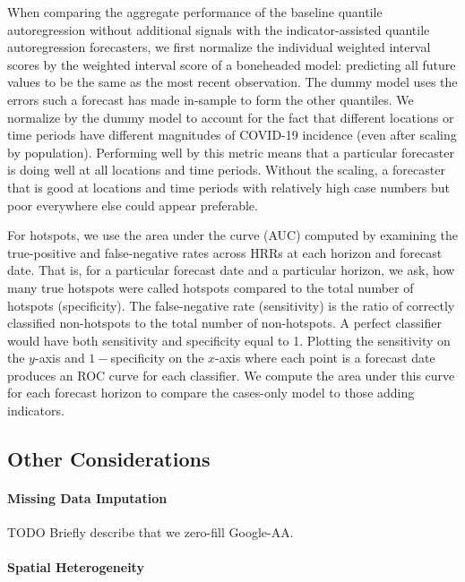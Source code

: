 \documentclass[9pt,twocolumn,twoside,lineno]{pnas-new}
\begin{document}
When comparing the aggregate performance of the baseline quantile autoregression
without additional signals with 
the indicator-assisted quantile autoregression forecasters, we first
normalize the individual weighted interval scores by the weighted interval
score of a boneheaded model: predicting all future values to be the same as the
most recent observation. The dummy model uses the errors such a forecast has
made in-sample to form the other quantiles. We normalize by 
the dummy model to account for the fact that different locations or
time periods have different magnitudes of COVID-19 incidence (even after
scaling by population). Performing well by this metric means that a particular
forecaster is doing well at all locations and time periods. Without the scaling,
a forecaster that is good at locations and time periods with relatively high
case numbers but poor everywhere else could appear preferable. 

For hotspots, we use the area under the curve (AUC) computed by examining the
true-positive and false-negative rates across HRRs at each horizon and forecast
date. That is, for a particular forecast date and a particular horizon, we ask,
how many true hotspots were called hotspots compared to the total number of
hotspots (specificity). The false-negative rate (sensitivity) is the ratio of
correctly classified non-hotspots to the total number of non-hotspots. A perfect
classifier would have both sensitivity and specificity equal to 1. Plotting the
sensitivity on the $y$-axis and $1-$specificity on the $x$-axis where each point
is a forecast date produces an ROC curve for each classifier. We compute the
area under this curve for each forecast horizon to compare the cases-only model
to those adding indicators. 

\subsection{Other Considerations}

\paragraph{Missing Data Imputation}

TODO Briefly describe that we zero-fill Google-AA.

\paragraph{Spatial Heterogeneity}
\end{document}
